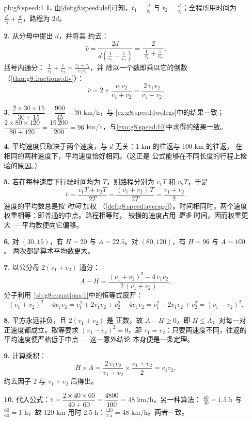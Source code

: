 \begin{solution}{pb:g8:speed:1}
\textbf{1.} 由\cref{def:g8:speed:def}可知，$t_1 = \frac{d}{v_1}$ 与
$t_2 = \frac{d}{v_2}$；全程所用时间为
$\frac{d}{v_1} + \frac{d}{v_2}$，路程为 $2d$。

\textbf{2.} 从分母中提出 $d$，并将其
约去：
\[
\bar v
= \frac{2d}{d\left(\frac{1}{v_1} + \frac{1}{v_2}\right)}
= \frac{2}{\ \frac{1}{v_1} + \frac{1}{v_2}\ } .
\]
括号内通分：
$\frac{1}{v_1} + \frac{1}{v_2} = \frac{v_2 + v_1}{v_1 v_2}$，并
除以一个数即乘以它的倒数
（\cref{thm:g8:fractions:div}）：
\[
\bar v = 2 \times \frac{v_1 v_2}{v_1 + v_2}
= \frac{2\, v_1 v_2}{v_1 + v_2} .
\]

\textbf{3.} $\dfrac{2 \times 30 \times 15}{30 + 15}
= \dfrac{900}{45} = 20$ km/h，与
\cref{ex:g8:speed:twolegs}中的结果一致；
$\dfrac{2 \times 80 \times 120}{80 + 120} = \dfrac{19\,200}{200}
= 96$ km/h，与\cref{exo:g8:speed:10}中求得的结果一致。

\textbf{4.} 平均速度只取决于两个速度，与
$d$ 无关：$1$ km 的往返与 $100$ km 的往返，
在相同的两种速度下，平均速度恰好相同。（这正是
公式能够在不同长度的行程上检验的原因。）

\textbf{5.} 若在每种速度下行驶时间均为 $T$，则路程分别为 $v_1 T$
和 $v_2 T$，于是
\[
\bar v = \frac{v_1 T + v_2 T}{2T}
= \frac{(v_1 + v_2)\,T}{2T}
= \frac{v_1 + v_2}{2} .
\]
速度的平均数总是按 \emph{时间} 加权
（\cref{def:g8:speed:average}）。时间相同时，两个速度
权重相等：即普通的中点。路程相等时，
较慢的速度占用 \emph{更多} 时间，因而权重更大 ---
平均数便向它偏移。

\textbf{6.} 对 $(30, 15)$，有 $H = 20$ 与 $A = 22.5$。对
$(80, 120)$，有 $H = 96$ 与 $A = 100$。
两次都是算术平均数更大。

\textbf{7.} 以公分母 $2(v_1 + v_2)$ 通分：
\[
A - H
= \frac{(v_1 + v_2)^2 - 4\, v_1 v_2}{2\,(v_1 + v_2)} ,
\]
分子利用
\cref{pb:g8:equations:1}中的恒等式展开：
\[
(v_1 + v_2)^2 - 4 v_1 v_2
= v_1^2 + 2 v_1 v_2 + v_2^2 - 4 v_1 v_2
= v_1^2 - 2 v_1 v_2 + v_2^2
= (v_1 - v_2)^2 .
\]

\textbf{8.} 平方永远非负，且 $2(v_1 + v_2)$ 是
正数，故 $A - H \geq 0$，即 $H \leq A$，对每一对
正速度都成立。取等要求 $(v_1 - v_2)^2 = 0$，即
$v_1 = v_2$：只要两速度不同，往返的
平均速度便严格低于中点 --- 这一意外结论
本身便是一条定理。

\textbf{9.} 计算乘积：
\[
H \times A
= \frac{2\, v_1 v_2}{v_1 + v_2} \times \frac{v_1 + v_2}{2}
= v_1 v_2 ,
\]
约去因子 $2$ 与 $v_1 + v_2$ 后得出。

\textbf{10.} 代入公式：$\bar v = \dfrac{2 \times 40 \times 60}
{40 + 60} = \dfrac{4800}{100} = 48$ km/h。另一种算法：
$\frac{60}{40} = 1.5$ h 与 $\frac{60}{60} = 1$ h，故 $120$ km 用时
$2.5$ h：$\frac{120}{2.5} = 48$ km/h。两者一致。


\end{solution}
